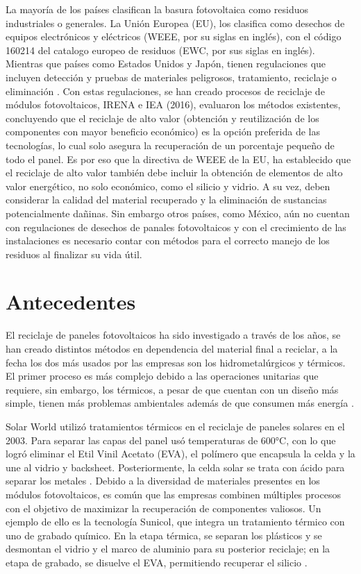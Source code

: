  La mayoría de los países clasifican la basura fotovoltaica como residuos industriales o generales. La Unión Europea (EU), los clasifica como desechos de equipos electrónicos y eléctricos (WEEE, por su siglas en inglés), con el código 160214 del catalogo europeo de residuos (EWC, por sus siglas en inglés)\citep{Azeumo2019}. Mientras que países como Estados Unidos y Japón, tienen regulaciones que incluyen detección y pruebas de materiales peligrosos, tratamiento, reciclaje o eliminación \citep{Xu2012}. Con estas regulaciones, se han creado procesos de reciclaje de módulos fotovoltaicos, IRENA e IEA (2016), evaluaron los métodos existentes, concluyendo que el reciclaje de alto valor (obtención y reutilización de los componentes con mayor beneficio económico) es la opción preferida de las tecnologías, lo cual solo asegura la recuperación de un porcentaje pequeño de todo el panel. Es por eso que la directiva de WEEE de la EU, ha establecido que el reciclaje de alto valor también debe incluir la obtención de elementos de alto valor energético, no solo económico, como el silicio y vidrio. A su vez, deben considerar la calidad del material recuperado y la eliminación de sustancias potencialmente dañinas. Sin embargo otros países, como México, aún no cuentan con regulaciones de desechos de panales fotovoltaicos y con el crecimiento de las instalaciones es necesario contar con métodos para el correcto manejo de los residuos al finalizar su vida útil. 
 
  
\section{Antecedentes}
\label{sec:Antecedentes}

El reciclaje de paneles fotovoltaicos ha sido investigado a través de los años, se han creado distintos métodos en dependencia del material final a reciclar, a la fecha los dos más usados por las empresas son los hidrometalúrgicos y térmicos. El primer proceso es más complejo debido a las operaciones unitarias que requiere, sin embargo, los térmicos, a pesar de que cuentan con un diseño más simple, tienen más problemas ambientales además de que consumen más energía \citep{Ardente2019}.

Solar World utilizó tratamientos térmicos en el reciclaje de paneles solares en el 2003. Para separar las capas del panel usó temperaturas de 600°C, con lo que logró eliminar el Etil Vinil Acetato (EVA), el polímero que encapsula la celda y la une al vidrio y backsheet. Posteriormente, la celda solar se trata con ácido para separar los metales \citep{appropedia_pv_recycling}. Debido a la diversidad de materiales presentes en los módulos fotovoltaicos, es común que las empresas combinen múltiples procesos con el objetivo de maximizar la recuperación de componentes valiosos. Un ejemplo de ello es la tecnología Sunicol, que integra un tratamiento térmico con uno de grabado químico. En la etapa térmica, se separan los plásticos y se desmontan el vidrio y el marco de aluminio para su posterior reciclaje; en la etapa de grabado, se disuelve el EVA, permitiendo recuperar el silicio \citep{Irena2016}.


